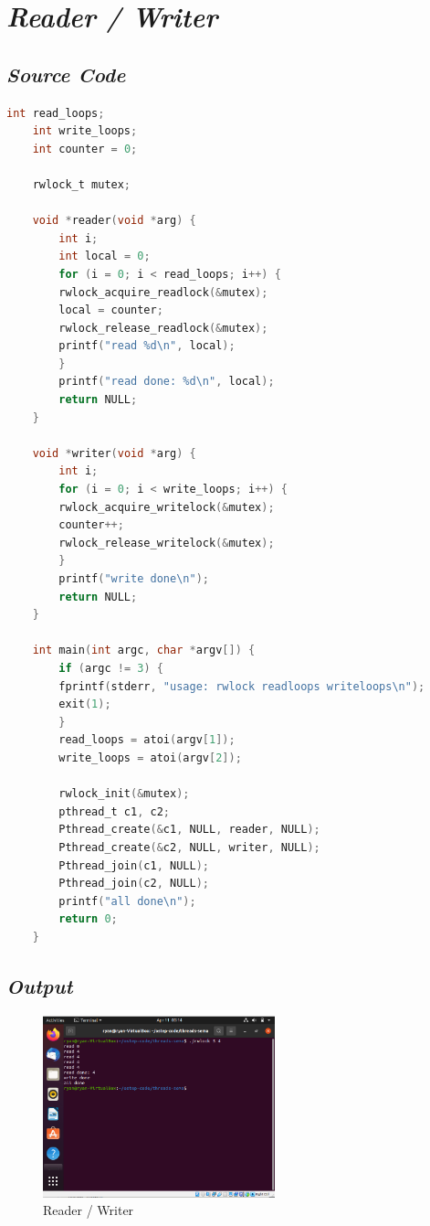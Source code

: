 \documentclass[11pt,a4paper]{article}
\begin{document}
\section{\textit{Reader / Writer}}
    \subsection{\textit{Source Code}}
    \begin{lstlisting}[language = C]		
	int read_loops;
	int write_loops;
	int counter = 0;

	rwlock_t mutex;

	void *reader(void *arg) {
		int i;
		int local = 0;
		for (i = 0; i < read_loops; i++) {
		rwlock_acquire_readlock(&mutex);
		local = counter;
		rwlock_release_readlock(&mutex);
		printf("read %d\n", local);
		}
		printf("read done: %d\n", local);
		return NULL;
	}

	void *writer(void *arg) {
		int i;
		for (i = 0; i < write_loops; i++) {
		rwlock_acquire_writelock(&mutex);
		counter++;
		rwlock_release_writelock(&mutex);
		}
		printf("write done\n");
		return NULL;
	}

	int main(int argc, char *argv[]) {
		if (argc != 3) {
		fprintf(stderr, "usage: rwlock readloops writeloops\n");
		exit(1);
		}
		read_loops = atoi(argv[1]);
		write_loops = atoi(argv[2]);
		
		rwlock_init(&mutex); 
		pthread_t c1, c2;
		Pthread_create(&c1, NULL, reader, NULL);
		Pthread_create(&c2, NULL, writer, NULL);
		Pthread_join(c1, NULL);
		Pthread_join(c2, NULL);
		printf("all done\n");
		return 0;
	}
\end{lstlisting}
  \subsection{\textit{Output}}
    \begin{figure}[h]
	\centering
	\includegraphics[width=0.6\textwidth]{Figure/rwlocks.png}
	\caption{Reader / Writer}
    \end{figure}
\end{document}
